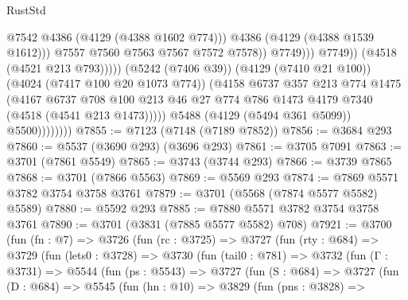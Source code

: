 \begin{lexlean}{RustStd}
\begin{coremodule}
{\begin{coremodule}
{{{{{{{{{{{{{{                                              @7542
                                              @4386
                                              (@4129 (@4388 @1602 @774)))
                                            @4386
                                            (@4129 (@4388 @1539 @1612)))
                                          @7557
                                          @7560
                                          @7563
                                          @7567
                                          @7572
                                          @7578))
                                      @7749)))
                                @7749))
                            (@4518 (@4521 @213 @793)))))
                      (@5242 (@7406 @39))
                      (@4129 (@7410 @21 @100))
                      (@4024 (@7417 @100 @20 @1073 @774))
                      (@4158
                        @6737
                        @357
                        @213
                        @774
                        @1475
                        (@4167
                          @6737
                          @708
                          @100
                          @213
                          @46
                          @27
                          @774
                          @786
                          @1473
                          @4179
                          @7340
                          (@4518 (@4541 @213 @1473)))))
                    @5488
                    (@4129 (@5494 @361 @5099))
                    @5500))))))))
@7855 := @7123 (@7148 (@7189 @7852))
@7856 := @3684 @293
@7860 := @5537 (@3690 @293) (@3696 @293)
@7861 := @3705 @7091
@7863 := @3701 (@7861 @5549)
@7865 := @3743 (@3744 @293)
@7866 := @3739 @7865
@7868 := @3701 (@7866 @5563)
@7869 := @5569 @293
@7874 := @7869 @5571 @3782 @3754 @3758 @3761
@7879 := @3701 (@5568 (@7874 @5577 @5582) @5589)
@7880 := @5592 @293
@7885 := @7880 @5571 @3782 @3754 @3758 @3761
@7890 := @3701 (@3831 (@7885 @5577 @5582) @708)
@7921 := @3700
    (fun (fn : @7) =>
    @3726
      (fun (rc : @3725) =>
      @3727
        (fun (rty : @684) =>
        @3729
          (fun (lets0 : @3728) =>
          @3730
            (fun (tail0 : @781) =>
            @3732
              (fun (Γ : @3731) =>
              @5544
                (fun (ps : @5543) =>
                @3727
                  (fun (S : @684) =>
                  @3727
                    (fun (D : @684) =>
                    @5545
                      (fun (hn : @10) =>
                      @3829
                        (fun (pns : @3828) =>
}}}}}}}}}}}}}}
\end{coremodule}}
\end{coremodule}
\end{lexlean}
